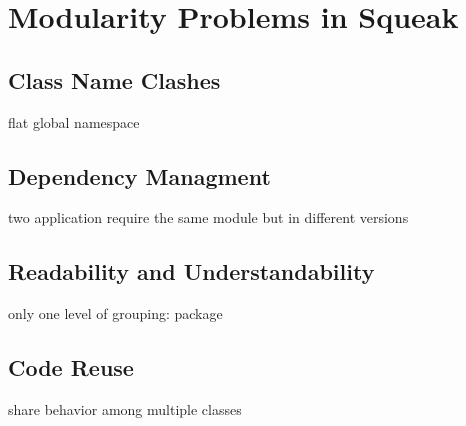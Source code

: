 \chapter{Modularity Problems in Squeak}

\section{Class Name Clashes}
flat global namespace

\section{Dependency Managment}
two application require the same module but in different versions

\section{Readability and Understandability}
only one level of grouping: package

\section{Code Reuse}
share behavior among multiple classes
